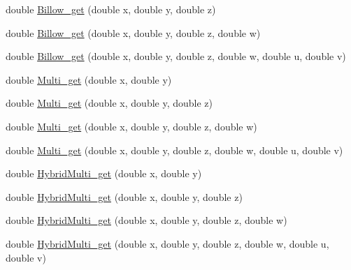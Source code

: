 \begin{DoxyCompactItemize}
\item 
double \hyperlink{classanl_1_1CImplicitFractal_aab8ab114b19b3e04dae0d87905034d58}{Billow\_\-get} (double x, double y, double z)
\item 
double \hyperlink{classanl_1_1CImplicitFractal_a4a103443ba1e739d63f8c1d046a3e114}{Billow\_\-get} (double x, double y, double z, double w)
\item 
double \hyperlink{classanl_1_1CImplicitFractal_a014fecebc7fe6ff0adb677419c9fdba4}{Billow\_\-get} (double x, double y, double z, double w, double u, double v)
\item 
double \hyperlink{classanl_1_1CImplicitFractal_ac5ff3cd0f009c7e77527135bb5f1e15e}{Multi\_\-get} (double x, double y)
\item 
double \hyperlink{classanl_1_1CImplicitFractal_ac4d9ee8b416db16e26b370d8af6d9a46}{Multi\_\-get} (double x, double y, double z)
\item 
double \hyperlink{classanl_1_1CImplicitFractal_a5229533eab3ba8c7350ded69ad05ae1d}{Multi\_\-get} (double x, double y, double z, double w)
\item 
double \hyperlink{classanl_1_1CImplicitFractal_a8f3a770fa04487a43358727073db6ad6}{Multi\_\-get} (double x, double y, double z, double w, double u, double v)
\item 
double \hyperlink{classanl_1_1CImplicitFractal_aae4e8956cd84e49194dac0424f2e74e8}{HybridMulti\_\-get} (double x, double y)
\item 
double \hyperlink{classanl_1_1CImplicitFractal_a9d6007a8839ac746e862ef1bbc29c334}{HybridMulti\_\-get} (double x, double y, double z)
\item 
double \hyperlink{classanl_1_1CImplicitFractal_a23dd9ce64676454bf0137400c035390e}{HybridMulti\_\-get} (double x, double y, double z, double w)
\item 
double \hyperlink{classanl_1_1CImplicitFractal_a127e38838bda3bcfd18d94fa63615965}{HybridMulti\_\-get} (double x, double y, double z, double w, double u, double v)
\end{DoxyCompactItemize}

